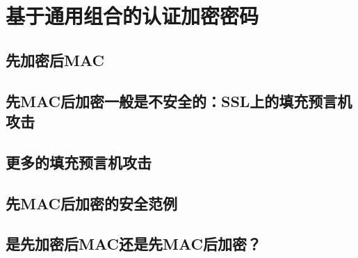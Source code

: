 \section{基于通用组合的认证加密密码}\label{sec:9-4}

\subsection{先加密后MAC}\label{subsec:9-4-1}

\subsection{先MAC后加密一般是不安全的：SSL上的填充预言机攻击}\label{subsec:9-4-2}

\subsection{更多的填充预言机攻击}\label{subsec:9-4-3}

\subsection{先MAC后加密的安全范例}\label{subsec:9-4-4}

\subsection{是先加密后MAC还是先MAC后加密？}\label{subsec:9-4-5}